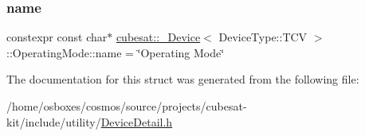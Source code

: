 \subsubsection{\texorpdfstring{name}{name}}
{\footnotesize\ttfamily constexpr const char$\ast$ \hyperlink{structcubesat_1_1__Device}{cubesat\+::\+\_\+\+Device}$<$ Device\+Type\+::\+T\+CV $>$\+::Operating\+Mode\+::name = \char`\"{}Operating Mode\char`\"{}\hspace{0.3cm}{\ttfamily [static]}}



The documentation for this struct was generated from the following file\+:\begin{DoxyCompactItemize}
\item 
/home/osboxes/cosmos/source/projects/cubesat-\/kit/include/utility/\hyperlink{DeviceDetail_8h}{Device\+Detail.\+h}\end{DoxyCompactItemize}
